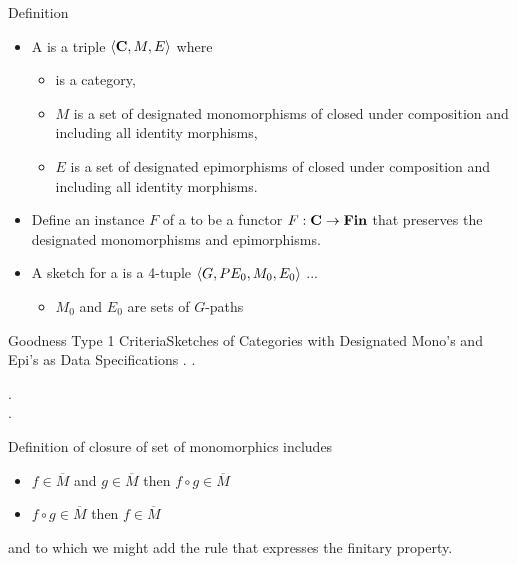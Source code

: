 


\renewcommand{\slidecontext}{Sketches of Categories with Designated Mono's and Epi's as Data Specifications}

\begin{frame}{Definition}
\begin{itemize}
\item A \term{\catMEterm} is a triple $\langle\textbf{C},M,E\rangle$ where 
\begin{itemize}
\item \catcw is a category,
\item $M$ is a set of designated monomorphisms of \catcw closed under composition and including all identity morphisms,
\item $E$ is a set of designated epimorphisms of \catcw closed under composition and including all identity morphisms.
\end{itemize}
\item Define an instance $F$ of a \catMEterm to be a functor $F: \textbf{C} \rightarrow \textbf{Fin}$ 
that preserves the designated monomorphisms and epimorphisms.


\item A sketch for a \catMEterm is a 4-tuple $\langle G,PE_0,M_0,E_0\rangle$ ...
\begin{itemize}
 \item   $M_0$ and $E_0$ are sets of $G$-paths  
\end{itemize}
\end{itemize}
\end{frame}

\begin{frame}{Goodness Type 1 Criteria}{\slidecontext}
\medskip
\goodnessoneA.
\medskip
\goodnessoneB.

\goodnessoneC. \\
\medskip
\goodnessoneD. \\
\medskip

Definition of closure of set of monomorphics includes
\begin{itemize}
\item $f \in \overline{M}$ and $g \in \overline{M}$ then $f \circ g \in \overline{M}$
\item $f \circ g \in \overline{M}$ then $f \in \overline{M}$
\end{itemize}
and to which we might add the rule that expresses the finitary property.
\end{frame}

